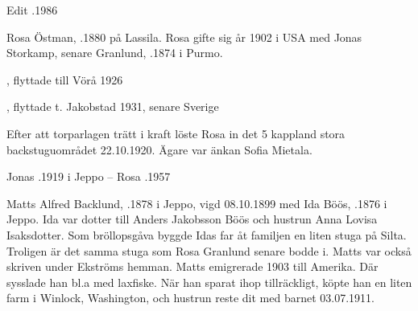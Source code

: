 Edit .1986



Rosa Östman, .1880 på Lassila. Rosa gifte sig år 1902 i USA med Jonas Storkamp, senare Granlund,  .1874 i Purmo.
\begin{jhchildren}
  \item {}, flyttade till Vörå 1926
  \item {}
  \item {}
  \item {}
  \item {}, flyttade t. Jakobstad 1931, senare Sverige
\end{jhchildren}

Efter att torparlagen trätt i kraft löste Rosa in det 5 kappland stora backstuguområdet 22.10.1920. Ägare var änkan Sofia Mietala.

Jonas .1919 i Jeppo  -- 	Rosa .1957


Matts Alfred Backlund, .1878 i Jeppo, vigd 08.10.1899 med Ida Böös, .1876 i Jeppo. Ida var dotter till Anders Jakobsson Böös och hustrun Anna Lovisa Isaksdotter. Som bröllopsgåva byggde Idas far åt familjen en liten stuga på Silta. Troligen är det samma stuga som Rosa Granlund senare bodde i. Matts var också skriven under Ekströms hemman. Matts emigrerade 1903 till Amerika. Där sysslade han bl.a med laxfiske. När han sparat ihop tillräckligt, köpte han en liten farm i Winlock, Washington, och hustrun reste dit med barnet 03.07.1911.
\begin{jhchildren}
  \item {}
  \item {}
  \item {}
  \item {}
  \item {}
\end{jhchildren}



